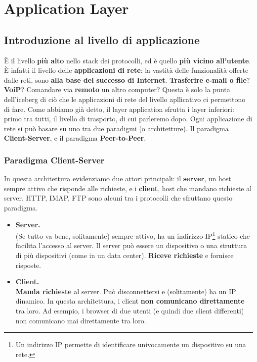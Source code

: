 \chapter{Application Layer}

\section{Introduzione al livello di applicazione}
È il livello \textbf{più alto} nello stack dei protocolli, ed è quello \textbf{più vicino all'utente}. È infatti il livello delle \textbf{applicazioni di rete}: la vastità delle funzionalità offerte dalle reti, sono \textbf{alla base del successo di Internet}. \textbf{Trasferire e-mail o file}? \textbf{VoiP}? Comandare via \textbf{remoto} un altro computer? Questa è solo la punta dell'iceberg di ciò che le applicazioni di rete del livello apllicativo ci permettono di fare. Come abbiamo già detto, il layer application sfrutta i layer inferiori: primo tra tutti, il livello di trasporto, di cui parleremo dopo. Ogni applicazione di rete si può basare su uno tra due paradigmi (o architetture). Il paradigma \textbf{Client-Server}, e il paradigma \textbf{Peer-to-Peer}.

\subsection{Paradigma Client-Server}
In questa architettura evidenziamo due attori principali: il \textbf{server}, un host sempre attivo che risponde alle richieste, e i \textbf{client}, host che mandano richieste al server. HTTP, IMAP, FTP sono alcuni tra i protocolli che sfruttano questo paradigma.

\begin{itemize}
    \item \textbf{Server.}\\
    (Se tutto va bene, solitamente) sempre attivo, ha un indirizzo IP\footnote{Un indirizzo IP permette di identificare univocamente un dispositivo su una rete.} statico che facilita l'accesso al server. Il server può essere un dispositivo o una struttura di più dispositivi (come in un data center). \textbf{Riceve richieste} e fornisce risposte.
    \item \textbf{Client.}\\
    \textbf{Manda richieste} al server. Può disconnettersi e (solitamente) ha un IP dinamico. In questa architettura, i client \textbf{non comunicano direttamente} tra loro. Ad esempio, i browser di due utenti (e quindi due client differenti) non comunicano mai direttamente tra loro. 
\end{itemize}


